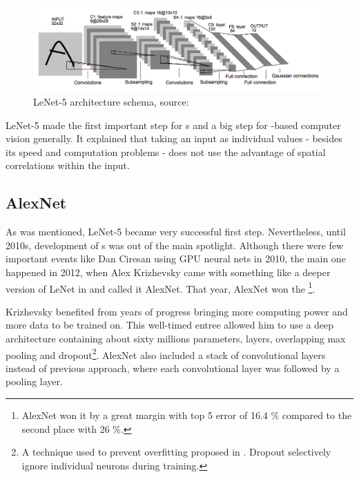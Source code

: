 \begin{figure}[H]
   \centering
	\includegraphics[width=\linewidth]{./pictures/lenet.png}
	\caption[LeNet-5 architecture]{LeNet-5 architecture schema, source: 
\cite{lenet5}}
      \label{fig:lenet}
\end{figure}

LeNet-5 made the first important step for s and a big step for 
-based computer vision generally. It explained that taking an input as 
individual values - besides its speed and computation problems - does not use 
the advantage of spatial correlations within the input. 



\subsection{AlexNet} %
\label{alexnet}

As was mentioned, LeNet-5 became very successful first step. Nevertheless, until 
2010s, development of s was out of the main spotlight. Although there 
were few important events like Dan Ciresan using GPU neural nets in 2010, the 
main one happened in 2012, when Alex Krizhevsky came with something like a 
deeper version of LeNet in \cite{cnn-classification} and called it AlexNet. That 
year, AlexNet won the \footnote{AlexNet won it by a great margin with 
top 5 error of 16.4 \% compared to the second place with 26 \%.}.

Krizhevsky benefited from years of progress bringing more computing power and 
more data to be trained on. This well-timed entree allowed him to use a deep 
architecture containing about sixty millions parameters,  layers, 
overlapping max pooling and dropout\footnote{A technique used to prevent 
overfitting proposed in \cite{dropout}. Dropout selectively ignore individual 
neurons during training.}. AlexNet also included a stack of convolutional layers 
instead of previous approach, where each convolutional layer was followed by a 
pooling layer. 

